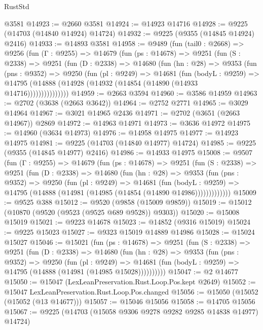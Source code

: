 \begin{lexlean}{RustStd}
\begin{coremodule}
    @3581
@14923 := @2660 @3581
@14924 := @14923 @14716
@14928 := @9225 (@14703 (@14840 @14924) @14724)
@14932 := @9225 (@9355 (@14845 @14924) @2416)
@14933 := @14893 @3581
@14958 := @9489
    (fun (tail0 : @2668) =>
    @9256
      (fun (Γ : @9255) =>
      @14679
        (fun (ps : @14678) =>
        @9251
          (fun (S : @2338) =>
          @9251
            (fun (D : @2338) =>
            @14680
              (fun (hn : @28) =>
              @9353
                (fun (pns : @9352) =>
                @9250
                  (fun (pl : @9249) =>
                  @14681
                    (fun (bodyL : @9259) =>
                    @14795 (@14888 (@14928 (@14932 (@14854 (@14890 (@14933 @14716)))))))))))))))
@14959 := @2663 @3594
@14960 := @3586 @14959
@14963 := @2702 (@3638 (@2663 @3642))
@14964 := @2752 @2771
@14965 := @3029 @14964
@14967 := @3021 @14965 @2436
@14971 := @2702 (@3651 (@2663 @14967)) @2869
@14972 := @14963 @14971
@14973 := @3636 @14972
@14975 := @14960 (@3634 @14973)
@14976 := @14958 @14975
@14977 := @14923 @14975
@14981 := @9225 (@14703 (@14840 @14977) @14724)
@14985 := @9225 (@9355 (@14845 @14977) @2416)
@14986 := @14933 @14975
@15008 := @9507
    (fun (Γ : @9255) =>
    @14679
      (fun (ps : @14678) =>
      @9251
        (fun (S : @2338) =>
        @9251
          (fun (D : @2338) =>
          @14680
            (fun (hn : @28) =>
            @9353
              (fun (pns : @9352) =>
              @9250
                (fun (pl : @9249) =>
                @14681
                  (fun (bodyL : @9259) =>
                  @14795 (@14888 (@14981 (@14985 (@14854 (@14890 @14986)))))))))))))
@15009 := @9525 @388
@15012 := @9520 (@9858 (@15009 @9859))
@15019 := @15012 (@10870 (@9520 (@9523 (@9525 @689 @9528)) @9303))
@15020 := @15008 @15019
@15021 := @9223 @14678
@15023 := @14852 (@9316 @15019)
@15024 := @9225 @15023
@15027 := @9323 @15019 @14889 @14986
@15028 := @15024 @15027
@15046 := @15021
    (fun (ps : @14678) =>
    @9251
      (fun (S : @2338) =>
      @9251
        (fun (D : @2338) =>
        @14680
          (fun (hn : @28) =>
          @9353
            (fun (pns : @9352) =>
            @9250
              (fun (pl : @9249) =>
              @14681 (fun (bodyL : @9259) => @14795 (@14888 (@14981 (@14985 @15028))))))))))
@15047 := @2 @14677
@15050 := @15047 (LexLeanPreservation.Rust.Loop.Pos.kept @2649)
@15052 := @15047 LexLeanPreservation.Rust.Loop.Pos.changed
@15056 := @15050 (@15052 (@15052 (@13 @14677)))
@15057 := @15046 @15056
@15058 := @14705 @15056
@15067 := @9225 (@14703 (@15058 @9306 @9278 @9282 @9285 @14838 @14977) @14724)

\end{coremodule}
\end{lexlean}
